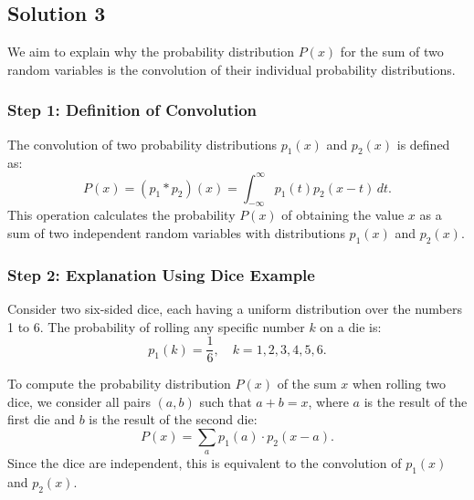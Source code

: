 \documentclass[12pt]{article}
\begin{document}
\begin{center}
\end{center}

\subsection*{Solution 3}

We aim to explain why the probability distribution \( P(x) \) for the sum of two random variables is the convolution of their individual probability distributions. 

\subsubsection*{Step 1: Definition of Convolution}
The convolution of two probability distributions \( p_1(x) \) and \( p_2(x) \) is defined as:
\[
P(x) = (p_1 * p_2)(x) = \int_{-\infty}^\infty p_1(t) p_2(x - t) \, dt.
\]
This operation calculates the probability \( P(x) \) of obtaining the value \( x \) as a sum of two independent random variables with distributions \( p_1(x) \) and \( p_2(x) \).

\subsubsection*{Step 2: Explanation Using Dice Example}
Consider two six-sided dice, each having a uniform distribution over the numbers 1 to 6. The probability of rolling any specific number \( k \) on a die is:
\[
p_1(k) = \frac{1}{6}, \quad k = 1, 2, 3, 4, 5, 6.
\]

To compute the probability distribution \( P(x) \) of the sum \( x \) when rolling two dice, we consider all pairs \( (a, b) \) such that \( a + b = x \), where \( a \) is the result of the first die and \( b \) is the result of the second die:
\[
P(x) = \sum_{a} p_1(a) \cdot p_2(x - a).
\]
Since the dice are independent, this is equivalent to the convolution of \( p_1(x) \) and \( p_2(x) \).
\end{document}
